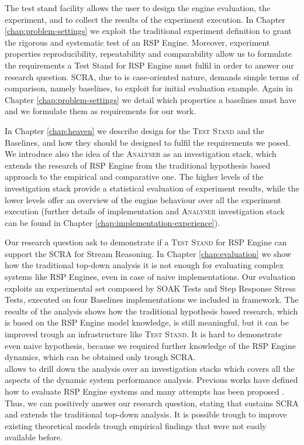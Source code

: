 The test stand facility allows the user to design the engine evaluation, the experiment, and to collect the results of the experiment execution. In Chapter \ref{chap:problem-settings} we exploit the traditional experiment definition to grant the rigorous and systematic test of an RSP Engine. Moreover, experiment properties reproducibility, repeatability and comparability allow us to formulate the requirements a Test Stand for RSP Engine must fulfil in order to answer our research question. SCRA, due to is case-oriented nature, demands simple terms of comparison, namely baselines, to exploit for initial evaluation example.  Again in Chapter \ref{chap:problem-settings} we detail which properties a baselines must have and we formulate them as  requirements for our work.

In Chapter \ref{chap:heaven} we describe \name design for the \textsc{Test Stand} and the Baselines, and how they should be designed to fulfil the requirements we posed. We introduce also the idea of the \textsc{Analyser} as an investigation stack, which extends the research of RSP Engine from the traditional hypothesis based approach to the empirical and comparative one. The higher levels of the investigation stack provide a statistical evaluation of experiment results, while the lower levels offer an overview of the engine behaviour over all the experiment execution (further details of \name implementation and \textsc{Analyser} investigation stack can be found in Chapter \ref{chap:implementation-experience}).

Our research question ask to demonstrate if a \textsc{Test Stand} for RSP Engine can support the SCRA for Stream Reasoning. In Chapter \ref{chap:evaluation} we show how the traditional top-down analysis it is not enough for evaluating complex systems like RSP Engines, even in case of naive implementations. Our evaluation exploits an experimental set composed by SOAK Tests and Step Response Stress Tests, executed on four Baselines implementations we included in \name framework. The results of the analysis shows how the traditional hypothesis based research, which is based on the RSP Engine model knowledge, is still meaningful, but it can be improved trough an infrastructure like \name \textsc{Test Stand}. It is hard to demonstrate even naive hypothesis, because we required further knowledge of the RSP Engine dynamics, which can be obtained only trough SCRA.\\

 \name allows to drill down the analysis over an investigation stacks which covers all the aspects of the dynamic system performance analysis. Previous works have defined how to evaluate RSP Engine systems \cite{DBLP:conf/esws/ScharrenbachUMVB13} and many attempts has been proposed \cite{Zhang2012, LePhuoc2012c, DBLP:conf/semweb/DellAglioCBCV13}. Thus, we can positively answer   our research question, stating that \name sustains SCRA and extends the traditional top-down analysis. It is possible trough \name to improve existing theoretical models trough empirical findings that were not easily available before.


